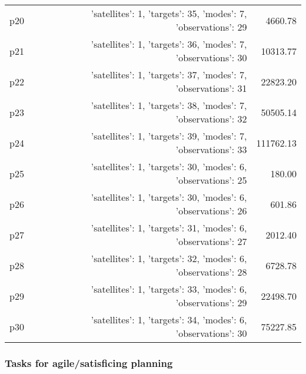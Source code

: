 \documentclass{article}
\begin{document}
\begin{center}
\begin{tabular}{@{}l|r|r@{}}
  p20&{'satellites': 1, 'targets': 35, 'modes': 7, 'observations': 29}&4660.78\\
  p21&{'satellites': 1, 'targets': 36, 'modes': 7, 'observations': 30}&10313.77\\
  p22&{'satellites': 1, 'targets': 37, 'modes': 7, 'observations': 31}&22823.20\\
  p23&{'satellites': 1, 'targets': 38, 'modes': 7, 'observations': 32}&50505.14\\
  p24&{'satellites': 1, 'targets': 39, 'modes': 7, 'observations': 33}&111762.13\\
  p25&{'satellites': 1, 'targets': 30, 'modes': 6, 'observations': 25}&180.00\\
  p26&{'satellites': 1, 'targets': 30, 'modes': 6, 'observations': 26}&601.86\\
  p27&{'satellites': 1, 'targets': 31, 'modes': 6, 'observations': 27}&2012.40\\
  p28&{'satellites': 1, 'targets': 32, 'modes': 6, 'observations': 28}&6728.78\\
  p29&{'satellites': 1, 'targets': 33, 'modes': 6, 'observations': 29}&22498.70\\
  p30&{'satellites': 1, 'targets': 34, 'modes': 6, 'observations': 30}&75227.85
                            \end{tabular}
                            \end{center}
                    

                                \subsubsection*{Tasks for agile/satisficing planning}
                                
\end{document}
